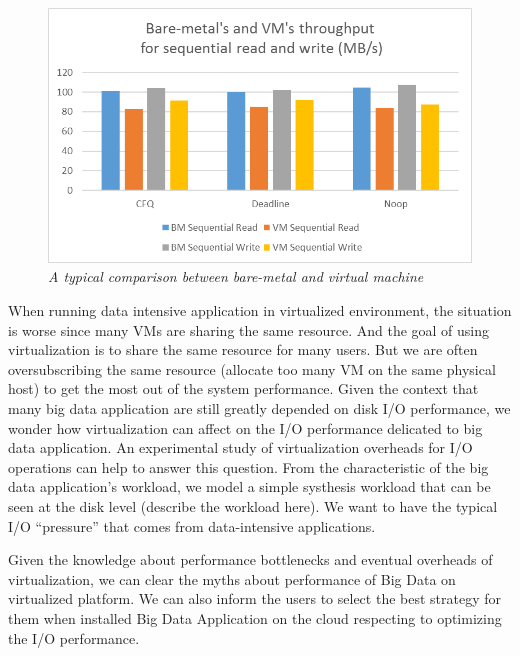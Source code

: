 \documentclass{acmsig}
\begin{document}
\begin{figure}[htbp]
  \centering
  \includegraphics[scale=0.4]{figures/bm_vs_vm.png}
  \caption{\textit{A typical comparison between bare-metal and virtual machine}}
  \label{fig:bm_vs_vm}
\end{figure}

When running data intensive application in virtualized environment, the situation is worse since many VMs are sharing the same resource.
And the goal of using virtualization is to share the same resource for many users.  But we are often oversubscribing the same resource (allocate too many VM on the same physical host) to get the most out of the system performance. Given the context that many big data application are still greatly depended on disk I/O performance, we wonder how virtualization can affect on the I/O performance delicated to big data application. An experimental study of virtualization overheads for I/O operations can help to answer this question. From the characteristic of the big data application's workload, we model a simple systhesis workload that can be seen at the disk level (describe the workload here). We want to have the typical I/O ``pressure'' that comes from data-intensive applications.

Given the knowledge about performance bottlenecks and eventual overheads of virtualization, we can clear the myths about performance of Big Data on virtualized platform. We can also inform the users to select the best strategy for them when installed Big Data Application on the cloud respecting to optimizing the I/O performance.


\end{document}

